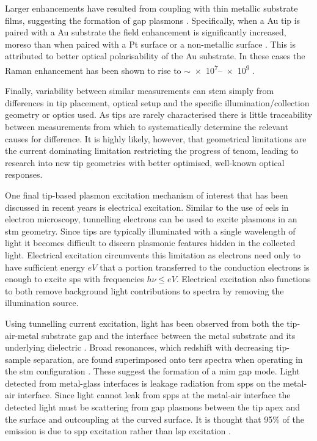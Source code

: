 \documentclass{article}
\begin{document}
Larger enhancements have resulted from coupling with thin metallic substrate films, suggesting the formation of gap plasmons \cite{ren2004, hayazawa2007, yano2007, pettinger2009, uetsuki2012}. Specifically, when a Au tip is paired with a Au substrate the field enhancement is significantly increased, moreso than when paired with a Pt surface \cite{ren2004} or a non-metallic surface \cite{downes2006}. This is attributed to better optical polarisability of the Au substrate. In these cases the Raman enhancement has been shown to rise to $\sim$\num{e7}--\num{e9} \cite{uetsuki2012}. %

Finally, variability between similar measurements can stem simply from differences in tip placement, optical setup and the specific illumination/collection geometry or optics used. As tips are rarely characterised there is little traceability between measurements from which to systematically determine the relevant causes for difference. It is highly likely, however, that geometrical limitations are the current dominating limitation restricting the progress of \gls{tenom}, leading to research into new tip geometries with better optimised, well-known optical responses.

One final tip-based plasmon excitation mechanism of interest that has been discussed in recent years is electrical excitation. Similar to the use of \gls{eels} in electron microscopy, tunnelling electrons can be used to excite plasmons in an \gls{stm} geometry. Since tips are typically illuminated with a single wavelength of light it becomes difficult to discern plasmonic features hidden in the collected light. Electrical excitation circumvents this limitation as electrons need only to have sufficient energy $eV$ that a portion transferred to the conduction electrons is enough to excite \glspl{sp} with frequencies $h\nu \leq eV$. Electrical excitation also functions to both remove background light contributions to spectra by removing the illumination source.

Using tunnelling current excitation, light has been observed from both the tip-air-metal substrate gap \cite{pettinger2007, pettinger2009} and the interface between the metal substrate and its underlying dielectric \cite{wang2011}. Broad resonances, which redshift with decreasing tip-sample separation, are found superimposed onto \gls{ters} spectra when operating in the \gls{stm} configuration \cite{pettinger2007, pettinger2009}. These suggest the formation of a \gls{mim} gap mode. Light detected from metal-glass interfaces is leakage radiation from \glspl{spp} on the metal-air interface. Since light cannot leak from \glspl{spp} at the metal-air interface the detected light must be scattering from gap plasmons between the tip apex and the surface {\color{red}and outcoupling at the curved surface}. It is thought that 95\% of the emission is due to \gls{spp} excitation rather than \gls{lsp} excitation \cite{wang2011}.
\end{document}
